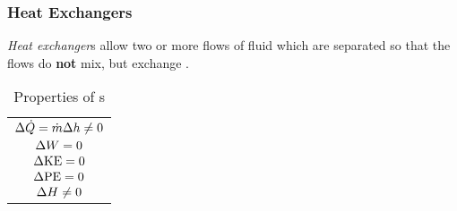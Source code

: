 \subsubsection{Heat Exchangers}\label{subsubsec:Heat_Exchangers}
\begin{definition}\label{def:Heat_Exchanger}
  \emph{Heat exchanger}s allow two or more flows of fluid which are separated so that the flows do \textbf{not} mix, but exchange .
\end{definition}

\begin{table}[h!tbp]
  \centering
  \begin{tabular}{c}
    \toprule
    \nameref{def:Heat_Exchanger} \\
    \midrule
    $\Delta \dot{Q} = \dot{m} \Delta h \neq 0$ \\
    $\Delta W = 0 $ \\
    $\Delta \mathrm{KE} = 0$ \\
    $\Delta \mathrm{PE} = 0$ \\
    $\Delta H \neq 0$ \\
    \bottomrule
  \end{tabular}
  \caption{Properties of s}
  \label{tab:Heat_Exchanger_Properties}
\end{table}

